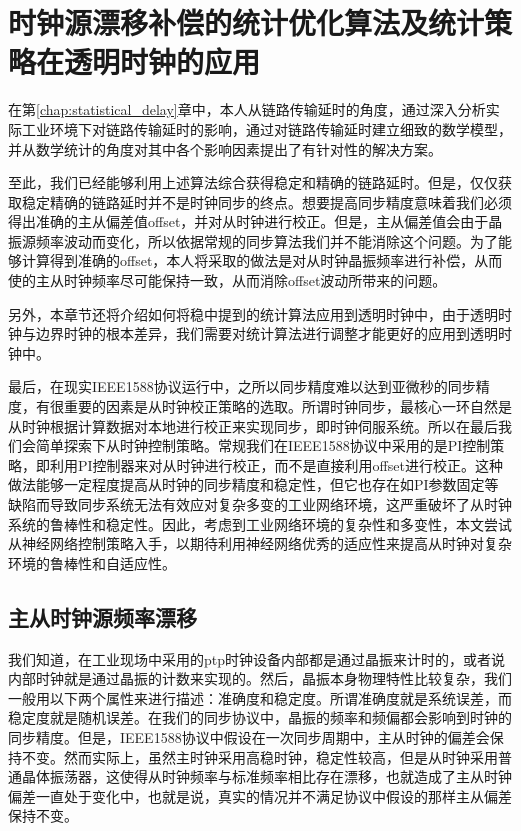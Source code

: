 
\chapter{时钟源漂移补偿的统计优化算法及统计策略在透明时钟的应用}
在第\ref{chap:statistical_delay}章中，本人从链路传输延时的角度，通过深入分析实际工业环境下对链路传输延时的影响，通过对链路传输延时建立细致的数学模型，并从数学统计的角度对其中各个影响因素提出了有针对性的解决方案。

至此，我们已经能够利用上述算法综合获得稳定和精确的链路延时。但是，仅仅获取稳定精确的链路延时并不是时钟同步的终点。想要提高同步精度意味着我们必须得出准确的主从偏差值offset，并对从时钟进行校正。但是，主从偏差值会由于晶振源频率波动而变化，所以依据常规的同步算法我们并不能消除这个问题。为了能够计算得到准确的offset，本人将采取的做法是对从时钟晶振频率进行补偿，从而使的主从时钟频率尽可能保持一致，从而消除offset波动所带来的问题。

另外，本章节还将介绍如何将稳中提到的统计算法应用到透明时钟中，由于透明时钟与边界时钟的根本差异，我们需要对统计算法进行调整才能更好的应用到透明时钟中。

最后，在现实IEEE1588协议运行中，之所以同步精度难以达到亚微秒的同步精度，有很重要的因素是从时钟校正策略的选取。所谓时钟同步，最核心一环自然是从时钟根据计算数据对本地进行校正来实现同步，即时钟伺服系统。所以在最后我们会简单探索下从时钟控制策略。常规我们在IEEE1588协议中采用的是PI控制策略，即利用PI控制器来对从时钟进行校正，而不是直接利用offset进行校正。这种做法能够一定程度提高从时钟的同步精度和稳定性，但它也存在如PI参数固定等缺陷而导致同步系统无法有效应对复杂多变的工业网络环境，这严重破坏了从时钟系统的鲁棒性和稳定性。因此，考虑到工业网络环境的复杂性和多变性，本文尝试从神经网络控制策略入手，以期待利用神经网络优秀的适应性来提高从时钟对复杂环境的鲁棒性和自适应性。

\section{主从时钟源频率漂移}
我们知道，在工业现场中采用的ptp时钟设备内部都是通过晶振来计时的，或者说内部时钟就是通过晶振的计数来实现的。然后，晶振本身物理特性比较复杂，我们一般用以下两个属性来进行描述：准确度和稳定度。所谓准确度就是系统误差，而稳定度就是随机误差。在我们的同步协议中，晶振的频率和频偏都会影响到时钟的同步精度。但是，IEEE1588协议中假设在一次同步周期中，主从时钟的偏差会保持不变。然而实际上，虽然主时钟采用高稳时钟，稳定性较高，但是从时钟采用普通晶体振荡器，这使得从时钟频率与标准频率相比存在漂移，也就造成了主从时钟偏差一直处于变化中，也就是说，真实的情况并不满足协议中假设的那样主从偏差保持不变。

